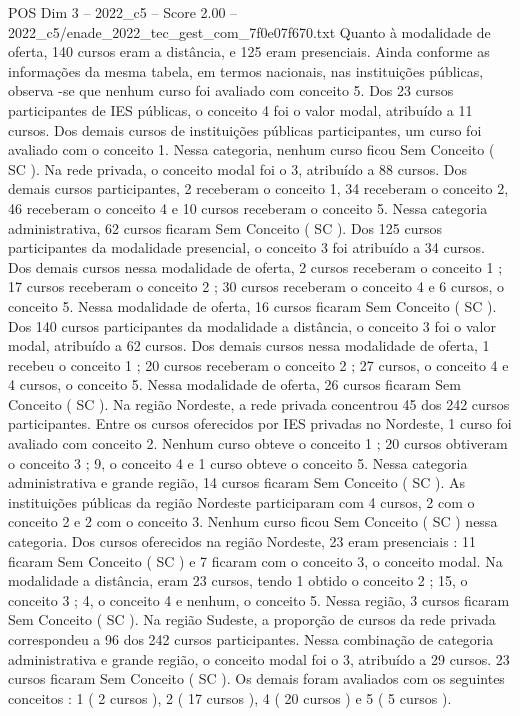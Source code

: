 \begin{textsample}{POS Dim 3 – 2022\_c5 – Score 2.00 – 2022\_c5/enade\_2022\_tec\_gest\_com\_7f0e07f670.txt}
Quanto à modalidade de oferta, 140 cursos eram a distância, e 125 eram presenciais.
Ainda conforme as informações da mesma tabela, em termos nacionais, nas instituições públicas, observa -se que nenhum curso foi avaliado com conceito 5.
Dos 23 cursos participantes de IES públicas, o conceito 4 foi o valor modal, atribuído a 11 cursos.
Dos demais cursos de instituições públicas participantes, um curso foi avaliado com o conceito 1.
Nessa categoria, nenhum curso ficou Sem Conceito ( SC ).
Na rede privada, o conceito modal foi o 3, atribuído a 88 cursos.
Dos demais cursos participantes, 2 receberam o conceito 1, 34 receberam o conceito 2, 46 receberam o conceito 4 e 10 cursos receberam o conceito 5.
Nessa categoria administrativa, 62 cursos ficaram Sem Conceito ( SC ).
Dos 125 cursos participantes da modalidade presencial, o conceito 3 foi atribuído a 34 cursos.
Dos demais cursos nessa modalidade de oferta, 2 cursos receberam o conceito 1 ; 17 cursos receberam o conceito 2 ; 30 cursos receberam o conceito 4 e 6 cursos, o conceito 5.
Nessa modalidade de oferta, 16 cursos ficaram Sem Conceito ( SC ).
Dos 140 cursos participantes da modalidade a distância, o conceito 3 foi o valor modal, atribuído a 62 cursos.
Dos demais cursos nessa modalidade de oferta, 1 recebeu o conceito 1 ; 20 cursos receberam o conceito 2 ; 27 cursos, o conceito 4 e 4 cursos, o conceito 5.
Nessa modalidade de oferta, 26 cursos ficaram Sem Conceito ( SC ).
Na região Nordeste, a rede privada concentrou 45 dos 242 cursos participantes.
Entre os cursos oferecidos por IES privadas no Nordeste, 1 curso foi avaliado com conceito 2.
Nenhum curso obteve o conceito 1 ; 20 cursos obtiveram o conceito 3 ; 9, o conceito 4 e 1 curso obteve o conceito 5.
Nessa categoria administrativa e grande região, 14 cursos ficaram Sem Conceito ( SC ).
As instituições públicas da região Nordeste participaram com 4 cursos, 2 com o conceito 2 e 2 com o conceito 3.
Nenhum curso ficou Sem Conceito ( SC ) nessa categoria.
Dos cursos oferecidos na região Nordeste, 23 eram presenciais : 11 ficaram Sem Conceito ( SC ) e 7 ficaram com o conceito 3, o conceito modal.
Na modalidade a distância, eram 23 cursos, tendo 1 obtido o conceito 2 ; 15, o conceito 3 ; 4, o conceito 4 e nenhum, o conceito 5.
Nessa região, 3 cursos ficaram Sem Conceito ( SC ).
Na região Sudeste, a proporção de cursos da rede privada correspondeu a 96 dos 242 cursos participantes.
Nessa combinação de categoria administrativa e grande região, o conceito modal foi o 3, atribuído a 29 cursos. 23 cursos ficaram Sem Conceito ( SC ).
Os demais foram avaliados com os seguintes conceitos : 1 ( 2 cursos ), 2 ( 17 cursos ), 4 ( 20 cursos ) e 5 ( 5 cursos ).

\end{textsample}
